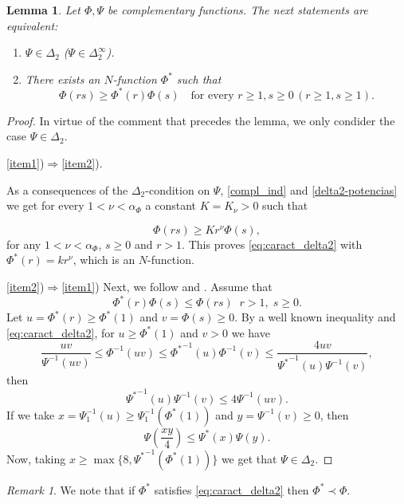 \documentclass[twoside]{article}
\newtheorem{lem}[thm]{Lemma}
\theoremstyle{remark}
\newtheorem{comentario}{Remark}
\renewcommand{\leq}{\leqslant}
\renewcommand{\geq}{\geqslant}
\begin{document}
\begin{lem}\label{lem:submultipliativa}
Let $\Phi,\Psi$ be complementary functions.
The next statements are equivalent:
\begin{enumerate}
\item\label{item1} $\Psi \in \Delta_2$ ($\Psi \in \Delta_2^{\infty}$).
\item\label{item2} There exists an $N$-function $\Phi^*$ such that
\begin{equation}\label{eq:caract_delta2}
\Phi(rs)\geq \Phi^*(r)\Phi(s)\quad\mbox{for every }r\geq1,s\geq 0\, (r\geq1,s\geq 1).
\end{equation}
\end{enumerate}
\end{lem}

\begin{proof}
 In virtue of the comment that precedes the lemma, we only condider the case   $\Psi \in \Delta_2$.

\ref{item1})$\Rightarrow$\ref{item2}).

As a consequences of the $\Delta_2$-condition on $\Psi$, \eqref{compl_ind} and \eqref{delta2-potencias} we get for every $1<\nu<\alpha_{\Phi}$ a constant $K=K_{\nu}>0$  such that

\begin{equation}\label{delta2-consecuencia}
\Phi(r s)\geq Kr^{\nu}\Phi(s),
\end{equation}
for any $1<\nu<\alpha_{\Phi}$,  $s\geq 0$ and $r>1$. This proves  \eqref{eq:caract_delta2} with $\Phi^*(r)=kr^\nu$, which is an $N$-function.

\ref{item2})$\Rightarrow$\ref{item1})
Next, we follow  \cite[p. 32, Prop. 13]{rao1991theory} and \cite[p. 29, Prop. 9]{rao1991theory}.
Assume that 
\[
\Phi^*(r)\Phi(s)\leq \Phi(rs)\;\;r>1,\;s\geq 0.
\]
Let $u=\Phi^*(r)\geq \Phi^*(1)$ and $v=\Phi(s)\geq 0$. By a well known inequality \cite[p. 13, Prop. 1]{rao1991theory} and \eqref{eq:caract_delta2},   for $u\geq \Phi^*(1)$ and $v> 0$ we have 
\[
\frac{uv}{\Psi^{-1}(uv)}\leq \Phi^{-1}(uv)\leq{\Phi^*}^{-1}(u)\Phi^{-1}(v)\leq
\frac{4uv}{{\Psi^*}^{-1}(u)\Psi^{-1}(v)},
\]
then 
\[
{\Psi^*}^{-1}(u)\Psi^{-1}(v)\leq 4 \Psi^{-1}(uv).
\]
If we take $x=\Psi^{-1}_1(u)\geq \Psi^{-1}_1(\Phi^*(1))$ and $y=\Psi^{-1}(v)\geq 0$, then 
\[
\Psi\left(\frac{xy}{4}\right)\leq \Psi^*(x)\Psi(y).
\]
Now, taking  $x\geq \max\{8,{\Psi^*}^{-1}(\Phi^*(1))\}$ we get that $\Psi \in \Delta_2$.
\end{proof}

\begin{comentario} We note that if $\Phi^*$ satisfies \eqref{eq:caract_delta2} then $\Phi^*\prec \Phi$.
 \end{comentario}
\end{document}

